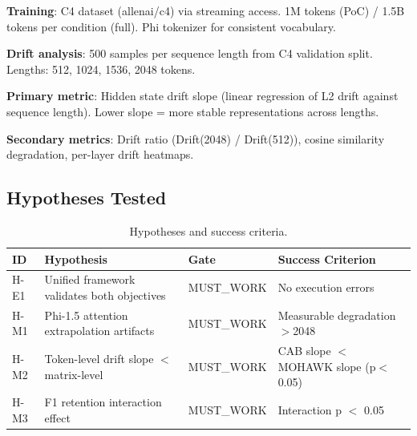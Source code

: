 \textbf{Training}: C4 dataset (allenai/c4) via streaming access. 1M tokens (PoC) / 1.5B tokens per condition (full). Phi tokenizer for consistent vocabulary.

\textbf{Drift analysis}: 500 samples per sequence length from C4 validation split. Lengths: 512, 1024, 1536, 2048 tokens.

\textbf{Primary metric}: Hidden state drift slope (linear regression of L2 drift against sequence length). Lower slope = more stable representations across lengths.

\textbf{Secondary metrics}: Drift ratio (Drift(2048) / Drift(512)), cosine similarity degradation, per-layer drift heatmaps.

\subsection{Hypotheses Tested}

\begin{table}[h]
\centering
\caption{Hypotheses and success criteria.}
\begin{tabular}{@{}llll@{}}
\toprule
ID & Hypothesis & Gate & Success Criterion \\
\midrule
H-E1 & Unified framework validates both objectives & MUST\_WORK & No execution errors \\
H-M1 & Phi-1.5 attention extrapolation artifacts & MUST\_WORK & Measurable degradation $>$2048 \\
H-M2 & Token-level drift slope $<$ matrix-level & MUST\_WORK & CAB slope $<$ MOHAWK slope (p$<$0.05) \\
H-M3 & F1 retention interaction effect & MUST\_WORK & Interaction p $<$ 0.05 \\
\bottomrule
\end{tabular}
\end{table}
